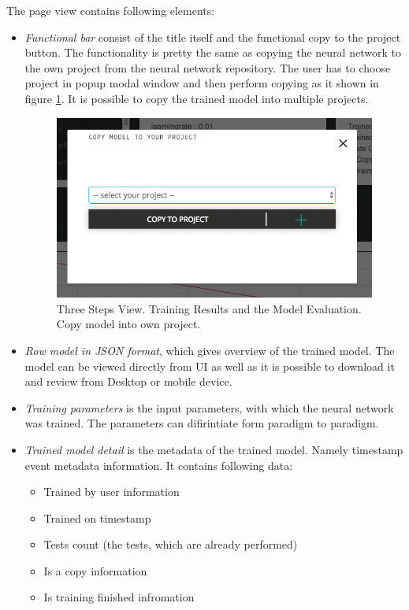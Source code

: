 The page view contains following elements:
\begin{itemize}
\item \emph{Functional bar} consist of the title itself and the functional copy to the project button. The functionality is pretty the same as copying the neural network to the own project from the neural network repository. The user has to choose project in popup modal window and then perform copying as it shown in figure \ref{fig:copy_model}. It is possible to copy the trained model into multiple projects. 

\begin{figure}[htbp]
\begin{center}
  \includegraphics[scale=0.5]{components/5/img/copy_model.png}
  \caption{Three Steps View. Training Results and the Model Evaluation. Copy model into own project.}
  \label{fig:copy_model}
\end{center}
\end{figure}

\item \emph{Row model in JSON format}, which gives overview of the trained model. The model can be viewed directly from UI as well as it is possible to download it and review from Desktop or mobile device. 
\item \emph{Training parameters} is the input parameters, with which the neural network was trained. The parameters can difirintiate form paradigm to paradigm.
\item \emph{Trained model detail} is the metadata of the trained model. Namely timestamp event metadata information. It contains following data:
\begin{itemize}
\item Trained by user information
\item Trained on timestamp
\item Tests count (the tests, which are already performed)
\item Is a copy information
\item Is training finished infromation
\end{itemize}


\end{itemize}
